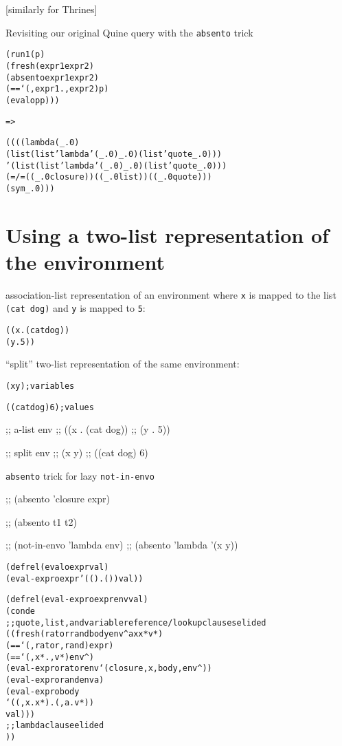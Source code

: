 \documentclass{book}
\begin{document}
[similarly for Thrines]

Revisiting our original Quine query with the \verb|absento| trick

\begin{alltt}
(run 1 (p)
  (fresh (expr1 expr2)
    (absento expr1 expr2)
    (== `(,expr1 . ,expr2) p)
    (evalo p p)))
\end{alltt}
\verb|=>|
\begin{alltt}
((((lambda (_.0)
     (list (list 'lambda '(_.0) _.0) (list 'quote _.0)))
   '(list (list 'lambda '(_.0) _.0) (list 'quote _.0)))
  (=/= ((_.0 closure)) ((_.0 list)) ((_.0 quote)))
  (sym _.0)))
\end{alltt}


\chapter{Using a two-list representation of the environment}%

association-list representation of an environment where \verb|x| is mapped to the list \verb|(cat dog)| and \verb|y| is mapped to \verb|5|:
\begin{alltt}
((x . (cat dog))
 (y . 5))
\end{alltt}
  
``split'' two-list representation of the same environment:
\begin{alltt}
(x y) ; variables

((cat dog) 6) ; values
\end{alltt}

;; a-list env
;; ((x . (cat dog))
;;  (y . 5))

;; split env
;; (x y)
;; ((cat dog) 6)

\verb|absento| trick for lazy \verb|not-in-envo|

;; (absento 'closure expr)

;; (absento t1 t2)

;; (not-in-envo 'lambda env)
;; (absento 'lambda '(x y))

\begin{alltt}
(defrel (evalo expr val)
  (eval-expro expr '(() . ()) val))
\end{alltt}

\begin{alltt}  
(defrel (eval-expro expr env val)
  (conde
    ;; quote, list, and variable reference/lookup clauses elided
    ((fresh (rator rand body env^ a x x* v*)
       (== `(,rator ,rand) expr)
       (== `(,x* . ,v*) env^)
       (eval-expro rator env `(closure ,x ,body ,env^))
       (eval-expro rand env a)
       (eval-expro body
                  `((,x . x*) . (,a . v*))
                  val)))
    ;; lambda clause elided
    ))
\end{alltt}
\end{document}
